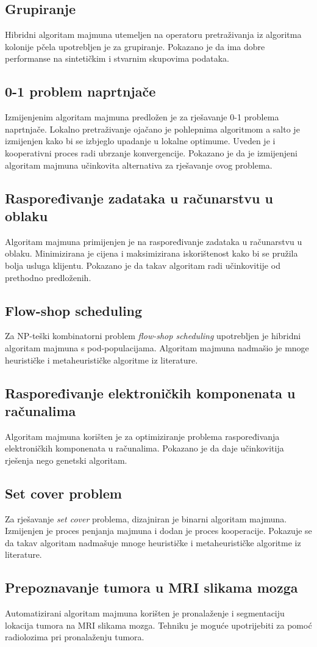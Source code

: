 \subsection{Grupiranje}
Hibridni algoritam majmuna utemeljen na operatoru pretraživanja iz algoritma kolonije pčela upotrebljen je za grupiranje. \cite{Chen2014} Pokazano je da ima dobre performanse na sintetičkim i stvarnim skupovima podataka.

\subsection{0-1 problem naprtnjače}
Izmijenjenim algoritam majmuna predložen je za rješavanje 0-1 problema naprtnjače.\cite{ZHOU2016817} Lokalno pretraživanje ojačano je pohlepnima algoritmom a salto je izmijenjen kako bi se izbjeglo upadanje u lokalne optimume. Uveden je i kooperativni proces radi ubrzanje konvergencije. Pokazano je da je izmijenjeni algoritam majmuna učinkovita alternativa za rješavanje ovog problema.

\subsection{Raspoređivanje zadataka u računarstvu u oblaku}
Algoritam majmuna primijenjen je na raspoređivanje zadataka u računarstvu u oblaku.\cite{8313789} Minimizirana je cijena i maksimizirana iskorištenost kako bi se pružila bolja usluga klijentu. Pokazano je da takav algoritam radi učinkovitije od prethodno predloženih.

\subsection{Flow-shop scheduling}
Za NP-teški kombinatorni problem \textit{flow-shop scheduling} upotrebljen je hibridni algoritam majmuna s pod-populacijama.\cite{MARICHELVAM201782} Algoritam majmuna nadmašio je mnoge heurističke i metaheurističke algoritme iz literature.

\subsection{Raspoređivanje elektroničkih komponenata u računalima}
Algoritam majmuna korišten je za optimiziranje problema raspoređivanja elektroničkih komponenata u računalima.\cite{Kuliev_2018} Pokazano je da daje učinkovitija rješenja nego genetski algoritam.

\subsection{Set cover problem}
Za rješavanje \textit{set cover} problema, dizajniran je binarni algoritam majmuna.\cite{Crawford2020} Izmijenjen je proces penjanja majmuna i dodan je proces kooperacije. Pokazuje se da takav algoritam nadmašuje mnoge heurističke i metaheurističke algoritme iz literature. 


\subsection{Prepoznavanje tumora u MRI slikama mozga}
Automatizirani algoritam majmuna korišten je pronalaženje i segmentaciju lokacija tumora na MRI slikama mozga.\cite{Alagarsamy_2020} Tehniku je moguće upotrijebiti za pomoć radiolozima pri pronalaženju tumora.
